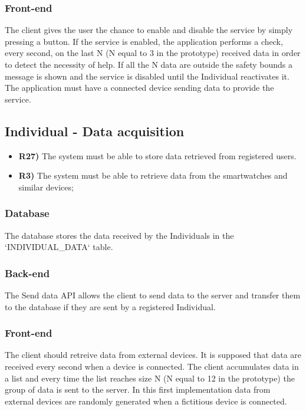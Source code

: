 \subsubsection*{Front-end}
The client gives the user the chance to enable and disable the service by simply pressing a button. If the service is enabled, the application performs a check, every second, on the last N (N equal to 3 in the prototype) received data in order to detect the necessity of help. If all the N data are outside the safety bounds a message is shown and the service is disabled until the Individual reactivates it.
The application must have a connected device sending data to provide the service.


\subsection{Individual - Data acquisition}
\begin{itemize}	
	\item {\color{Green}\textbf{R27)}} The system must be able to store data retrieved from registered users.
	\item {\color{Red}\textbf{R3)}} The system must be able to retrieve data from the smartwatches and similar devices;
\end{itemize}

\subsubsection*{Database}
The database stores the data received by the Individuals in the `INDIVIDUAL_DATA` table.

\subsubsection*{Back-end}
The Send data API allows the client to send data to the server and transfer them to the database if they are sent by a registered Individual.

\subsubsection*{Front-end}
The client should retreive data from external devices. It is supposed that data are received every second when a device is connected. The client accumulates data in a list and every time the list reaches size N (N equal to 12 in the prototype) the group of data is sent to the server.
In this first implementation data from external devices are randomly generated when a fictitious device is connected.



